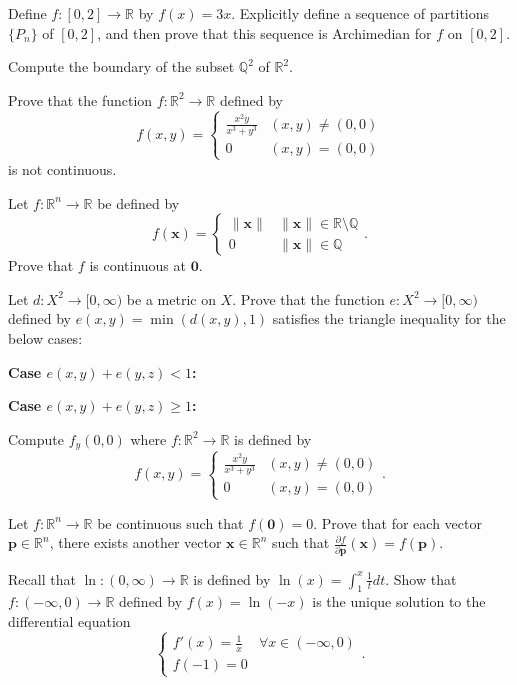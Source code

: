 \documentclass[12pt]{exam}
\newcommand{\vect}[1]{\ensuremath{\mathbf{#1}}}
\newcommand{\<}{\langle}
\renewcommand{\>}{\rangle}
\begin{document}
\newpage

\begin{questions}
\question[15]
Define \(f:[0,2]\to\mathbb R\) by \(f(x)=3x\). Explicitly define a sequence of
partitions \(\{P_n\}\) of \([0,2]\), and then prove that this sequence
is Archimedian for \(f\) on \([0,2]\).

\newpage
\question[15]
Compute the boundary of the subset \(\mathbb Q^2\) of \(\mathbb R^2\).

\newpage
\question[15]
Prove that the function \(f:\mathbb R^2\to\mathbb R\) defined by
\[
f(x,y) =
\begin{cases}
  \frac{x^2y}{x^3+y^3} & (x,y)\not=(0,0) \\
  0 & (x,y)=(0,0)
\end{cases}
\]
is not continuous.

\newpage
\question[15]
Let \(f:\mathbb R^n\to\mathbb R\) be defined by
\[
f(\vect x) =
\begin{cases}
  \|\vect x\| & \|\vect x\|\in \mathbb R\setminus\mathbb Q\\
  0 & \|\vect x\|\in\mathbb Q
\end{cases}
.\]
Prove that \(f\) is continuous at \(\vect 0\).

\newpage
\question[15]
Let \(d:X^2\to[0,\infty)\) be a metric on \(X\). Prove that the function
\(e:X^2\to[0,\infty)\) defined by \(e(x,y)=\min(d(x,y),1)\) satisfies
the triangle inequality for the below cases:

\textbf{Case \(e(x,y)+e(y,z)<1\):}
\vfill
\vfill

\textbf{Case \(e(x,y)+e(y,z)\geq 1\):}
\vfill


\newpage
\question[15]
Compute \(f_y(0,0)\) where \(f:\mathbb R^2\to\mathbb R\) is defined by
\[
f(x,y) =
\begin{cases}
  \frac{x^2y}{x^3+y^3} & (x,y)\not=(0,0) \\
  0 & (x,y)=(0,0)
\end{cases}
.\]

\newpage
\question[15]
Let \(f:\mathbb R^n\to\mathbb R\) be continuous such that
\(f(\vect 0)=0\). Prove that for each vector \(\vect p\in\mathbb R^n\),
there exists another vector \(\vect x\in\mathbb R^n\) such that
\(\frac{\partial f}{\partial\vect p}(\vect x)=f(\vect p)\).

\newpage
\question[15]
Recall that \(\ln:(0,\infty)\to\mathbb R\) is defined
by \(\ln(x)=\int_1^x\frac{1}{t}dt\).
Show that \(f:(-\infty,0)\to\mathbb R\) defined by
\(f(x)=\ln(-x)\) is the unique solution to the differential equation
\[
\begin{cases}
  f'(x)=\frac{1}{x} & \forall x\in(-\infty,0) \\
  f(-1)=0
\end{cases}
.\]

\end{questions}
\end{document}
